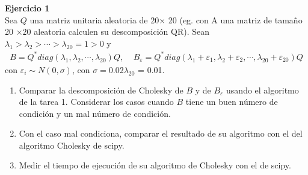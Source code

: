 \documentclass[a4paper, 11pt]{article}
\newenvironment{problem}[2][Ejercicio]
{ \begin{mdframed}[backgroundcolor= red!50] \textbf{#1 #2} \\}
	{  \end{mdframed}}
\begin{document}
	\setlength{\parskip}{\medskipamount}
	\setlength{\parindent}{0pt}

\begin{problem}{1}
    Sea $Q$ una matriz unitaria aleatoria de 20$\times$ 20 (eg. con A una matriz de tamaño 20 $\times20$ aleatoria calculen su descomposición QR). Sean $\lambda_1 > \lambda_2 > \cdots > \lambda_{20} = 1 >0$ y 
    \begin{align*}
      B = Q^*diag(\lambda_1,\lambda_2, \cdots , \lambda_{20} )Q, \:\:\:\:\: B_{\varepsilon} = Q^*diag(\lambda_1 + \varepsilon_1,\lambda_2+\varepsilon_2, \cdots , \lambda_{20}+\varepsilon_{20} )Q
    \end{align*}
    con $\varepsilon_i \sim N(0,\sigma)$, con $\sigma = $0.02$\lambda_{20}$ = 0.01.  

    \begin{enumerate}
        \item Comparar la descomposición de Cholesky de $B$ y de $B_\varepsilon$ usando el algoritmo de la tarea 1. Considerar los casos cuando $B$ tiene un buen número de condición y un mal número de condición.
        \item Con el caso mal condiciona, comparar el resultado de su algoritmo con el del algoritmo Cholesky de scipy.
        \item Medir el tiempo de ejecución de su algoritmo de Cholesky con el de scipy.
    \end{enumerate}


\end{problem}
\end{document}
